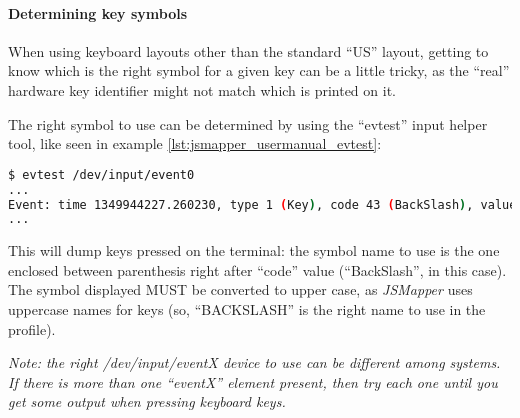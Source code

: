  
\paragraph{Determining key symbols}
When using keyboard layouts other than the standard ``US'' layout, getting to know which is the right symbol for a given key can be a little tricky, as the ``real'' hardware key identifier might not match which is printed on it.

The right symbol to use can be determined by using the ``evtest'' input helper tool, like seen in example \ref{lst:jsmapper_usermanual_evtest}:
\begin{lstlisting}[language=bash,caption={Getting key names},label={lst:jsmapper_usermanual_evtest}]
$ evtest /dev/input/event0
...
Event: time 1349944227.260230, type 1 (Key), code 43 (BackSlash), value 0
...
\end{lstlisting}

This will dump keys pressed on the terminal: the symbol name to use is the one enclosed between parenthesis right after ``code'' value (``BackSlash'', in this case). The symbol displayed MUST be converted to upper case, as \emph{JSMapper} uses uppercase names for keys (so, ``BACKSLASH'' is the right name to use in the profile).

\textit{Note: the right \emph{/dev/input/eventX} device to use can be different among systems. If there is more than one ``eventX'' element present, then try each one until you get some output when pressing keyboard keys.}


